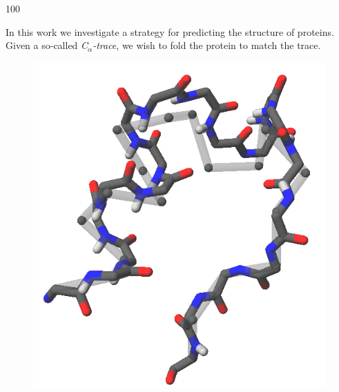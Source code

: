 \documentclass[a0,portrait]{a0poster}
\newcommand{\Ca}{C$_{\alpha}${}}
\begin{document}
\begin{GridBlock}{0}{21}{100}
\begin{multicols}{3}

\vspace*{-.4cm}
In this work we investigate a strategy for predicting the structure of proteins. Given a so-called \emph{\Ca-trace}, we wish to fold the protein to match the trace.
\begin{figure}
\vspace{1.7cm}
\hspace{-3cm}
\includegraphics[width=.4\columnwidth]{../rapport/figures/forside.png}
\vspace{-1.5cm}
\end{figure}







\end{multicols}
\end{GridBlock}
\end{document}
